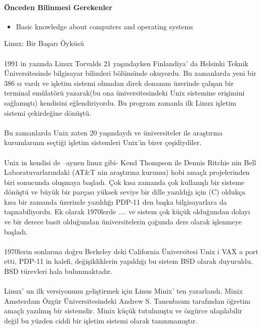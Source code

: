 \documentclass[10pt,a5paper]{book}
\begin{document}
\paragraph{Önceden Bilinmesi Gerekenler}
\begin{itemize}
 \item Basic knowledge about computers and operating systems
 \end{itemize}
\begin{section}{Linux: Bir Başarı Öyküsü}
\paragraph{}{1991 in yazında Linux Torvalds 21 yaşındayken Finlandiya’ da Helsinki Teknik Üniversitesinde bilgisayar bilimleri bölümünde okuyordu. Bu zamanlarda yeni bir 386 sı vardı ve işletim sistemi olmadan direk donanım üzerinde çalışan bir terminal emülatörü yazarak(bu ona üniversitesindeki Unix sistemine erişimini sağlamıştı) kendisini eğlendiriyordu.  Bu program zamanla ilk Linux işletim sistemi çekirdeğine dönüştü.}
\paragraph{}{Bu zamanlarda Unix zaten 20 yaşındaydı ve üniversiteler ile araştırma kurumlarının seçtiği işletim sistemleri Unix'in birer çeşidiydiler.}
\paragraph{}{Unix in kendisi de –aynen linux gibi- Kend Thompson ile Dennis Ritchie nin Bell Laboratuvarlarındaki (AT\&T nin araştırma kurumu) hobi amaçlı projelerinden biri sonucunda oluşmaya başladı. Çok kısa zamanda çok kullanışlı bir sisteme dönüştü ve büyük bir parçası yüksek seviye bir dille yazıldığı için (C) oldukça kısa bir zamanda üzerinde yazıldığı PDP-11 den başka bilgisayarlara da taşınabiliyordu. Ek olarak 1970lerde .... ve sistem çok küçük olduğundan dolayı ve bir derece basit olduğundan üniversitelerin çoğunda ders olarak işlenmeye başladı.}
\paragraph{}{1970lerin sonlarına doğru Berkeley deki California Üniversitesi Unix i VAX a port etti, PDP-11 in halefi, değişikliklerin yapıldığı bu sistem BSD olarak duyuruldu. BSD türevleri hala bulunmaktadır.}
\paragraph{}{Linux’ un ilk versiyonunu geliştirmek için Linus Minix’ ten yararlandı. Minix Amsterdam Özgür Üniversitesindeki Andrew S. Tanenbaum tarafından öğretim amaçlı yazılmış bir sistemdir. Minix küçük tutulmuştu ve özgürce ulaşılabilir değil bu yüzden ciddi bir işletim sistemi olarak tanınmamıştır.}

\end{section}
\end{document}
